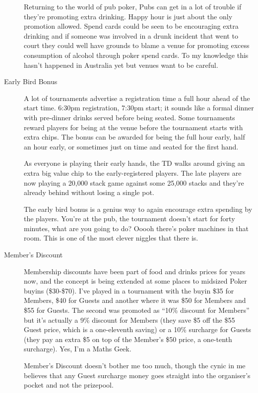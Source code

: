 \begin{description}
Returning to the world of pub poker, Pubs can get in a lot of trouble
if they're promoting extra drinking. Happy hour is just about the only
promotion allowed. Spend cards could be seen to be encouraging
extra drinking and if someone was involved in a drunk incident
that went to court they could well have grounds to blame a venue for
promoting excess consumption of alcohol through poker
spend cards. To my knowledge this hasn't happened in Australia yet
but venues want to be careful.

\item[Early Bird Bonus] A lot of tournaments advertise a registration
time a full hour ahead of the start time. 6:30pm registration, 7:30pm
start; it sounds like a formal dinner with pre-dinner drinks served
before being seated. Some tournaments reward players for being
at the venue before the tournament starts with extra
chips. The bonus can be awarded for being the full hour early, half an
hour early, or sometimes just on time and seated for the first hand.

As everyone is playing their early hands, the TD walks around
giving an extra big value chip to the early-registered players. The
late players are now playing a 20,000 stack game against some
25,000 stacks and they're already behind without losing a single pot.

The early bird bonus is a genius way to again encourage extra
spending by the players. You're at the pub, the tournament doesn't
start for forty minutes, what are you going to do? Ooooh there's poker
machines in that room. This is one of the most clever niggles that
there is.

\item[Member's Discount] Membership discounts have been part
of food and drinks prices for years now, and the concept
is being extended at some places to midsized Poker buyins
(\$30-\$70). I've played in a tournament with the buyin
\$35 for Members, \$40 for Guests and another where it was \$50
for Members and \$55 for Guests. The second was promoted as ``10\%
discount for Members'' but it's actually a 9\% discount for Members
(they save \$5 off the \$55 Guest price, which is a one-eleventh saving)
or a 10\% surcharge for Guests (they pay an extra \$5 on top of the
Member's \$50 price, a one-tenth surcharge). Yes, I'm a Maths Geek.

Member's Discount doesn't bother me too much, though the
cynic in me believes that any Guest surcharge money
goes straight into the organiser's pocket and not the prizepool.


\end{description}
